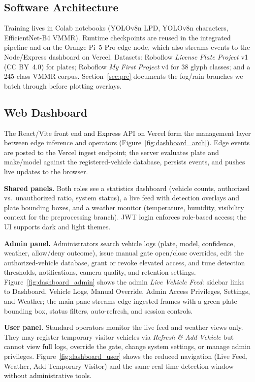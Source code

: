 \documentclass[10pt, conference]{IEEEtran}
\begin{document}
\subsection{Software Architecture}
Training lives in Colab notebooks (YOLOv8n LPD, YOLOv8n characters, EfficientNet-B4 VMMR). Runtime checkpoints are reused in the integrated pipeline and on the Orange Pi~5 Pro edge node, which also streams events to the Node/Express dashboard on Vercel. Datasets: Roboflow \emph{License Plate Project} v1 (CC BY~4.0) for plates; Roboflow \emph{My First Project} v4 for 38 glyph classes; and a 245-class VMMR corpus. Section~\ref{sec:pre} documents the fog/rain branches we batch through before plotting overlays.

\subsection{Web Dashboard}
\label{subsec:dashboard}
The React/Vite front end and Express API on Vercel form the management layer between edge inference and operators (Figure~\ref{fig:dashboard_arch}). Edge events are posted to the Vercel ingest endpoint; the server evaluates plate and make/model against the registered-vehicle database, persists events, and pushes live updates to the browser.

\textbf{Shared panels.} Both roles see a statistics dashboard (vehicle counts, authorized vs.\ unauthorized ratio, system status), a live feed with detection overlays and plate bounding boxes, and a weather monitor (temperature, humidity, visibility context for the preprocessing branch). JWT login enforces role-based access; the UI supports dark and light themes.

\textbf{Admin panel.} Administrators search vehicle logs (plate, model, confidence, weather, allow/deny outcome), issue manual gate open/close overrides, edit the authorized-vehicle database, grant or revoke elevated access, and tune detection thresholds, notifications, camera quality, and retention settings. Figure~\ref{fig:dashboard_admin} shows the admin \emph{Live Vehicle Feed}: sidebar links to Dashboard, Vehicle Logs, Manual Override, Admin Access Privileges, Settings, and Weather; the main pane streams edge-ingested frames with a green plate bounding box, status filters, auto-refresh, and session controls.

\textbf{User panel.} Standard operators monitor the live feed and weather views only. They may register temporary visitor vehicles via \emph{Refresh \& Add Vehicle} but cannot view full logs, override the gate, change system settings, or manage admin privileges. Figure~\ref{fig:dashboard_user} shows the reduced navigation (Live Feed, Weather, Add Temporary Visitor) and the same real-time detection window without administrative tools.
\end{document}
